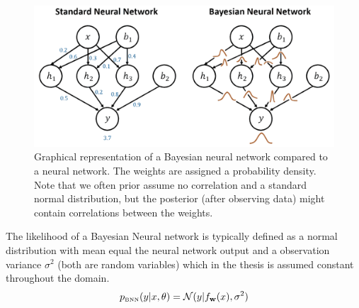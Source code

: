 \begin{figure}
    \centering
    \includegraphics[width=\textwidth]{Pictures/BNN_illustration.pdf}
    \caption{Graphical representation of a Bayesian neural network compared to a neural network. The
    weights are assigned a probability density. Note that we often prior assume no correlation and
    a standard normal distribution, but the posterior (after observing data) might contain
    correlations between the weights.}
    \label{BNN_illustration2}
\end{figure}

The likelihood of a Bayesian Neural network is typically defined as a normal distribution with mean
equal the neural network output and a observation variance $\sigma^2$ (both are random variables) which in the
thesis is assumed constant throughout the domain.  
$$p_{\text{\tiny BNN}}(y|x, \theta) = \mathcal{N}(y|f_{\textbf{w}}(x),\sigma^2)$$


